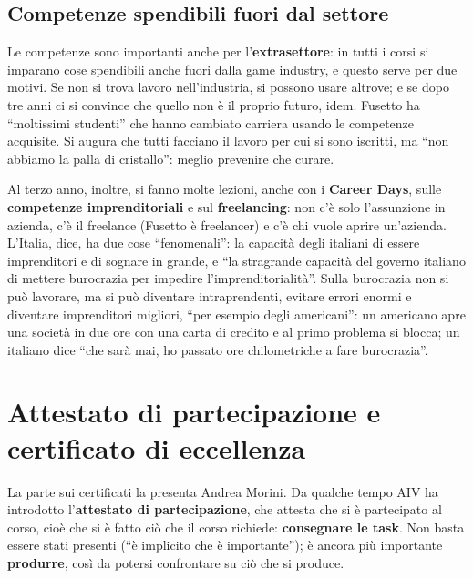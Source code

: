 \subsection{Competenze spendibili fuori dal settore}

Le competenze sono importanti anche per l'\textbf{extrasettore}: in tutti i
corsi si imparano cose spendibili anche fuori dalla game industry, e questo
serve per due motivi. Se non si trova lavoro nell'industria, si possono usare
altrove; e se dopo tre anni ci si convince che quello non è il proprio
futuro, idem. Fusetto ha ``moltissimi studenti'' che hanno cambiato carriera
usando le competenze acquisite. Si augura che tutti facciano il lavoro per cui
si sono iscritti, ma ``non abbiamo la palla di cristallo'': meglio prevenire
che curare.

Al terzo anno, inoltre, si fanno molte lezioni, anche con i \textbf{Career
Days}, sulle \textbf{competenze imprenditoriali} e sul
\textbf{freelancing}: non c'è solo l'assunzione in azienda, c'è il freelance
(Fusetto è freelancer) e c'è chi vuole aprire un'azienda. L'Italia, dice,
ha due cose ``fenomenali'': la capacità degli italiani di essere imprenditori
e di sognare in grande, e ``la stragrande capacità del governo italiano di
mettere burocrazia per impedire l'imprenditorialità''. Sulla burocrazia non
si può lavorare, ma si può diventare intraprendenti, evitare errori enormi e
diventare imprenditori migliori, ``per esempio degli americani'': un
americano apre una società in due ore con una carta di credito e al primo
problema si blocca; un italiano dice ``che sarà mai, ho passato ore
chilometriche a fare burocrazia''.

\section{Attestato di partecipazione e certificato di eccellenza}
\label{p1:sec:eccellenza}

La parte sui certificati la presenta Andrea Morini. Da qualche tempo AIV ha
introdotto l'\textbf{attestato di partecipazione}, che attesta che si è
partecipato al corso, cioè che si è fatto ciò che il corso richiede:
\textbf{consegnare le task}. Non basta essere stati presenti (``è implicito
che è importante''); è ancora più importante \textbf{produrre}, così da potersi
confrontare su ciò che si produce.


